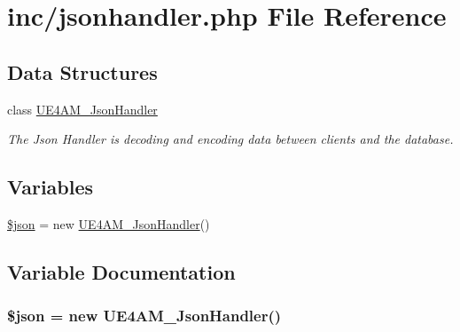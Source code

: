 \hypertarget{jsonhandler_8php}{\section{inc/jsonhandler.php File Reference}
\label{jsonhandler_8php}
}
\subsection*{Data Structures}
\begin{DoxyCompactItemize}
\item 
class \hyperlink{class_u_e4_a_m___json_handler}{U\-E4\-A\-M\-\_\-\-Json\-Handler}
\begin{DoxyCompactList}\small\item\em The Json Handler is decoding and encoding data between clients and the database. \end{DoxyCompactList}\end{DoxyCompactItemize}
\subsection*{Variables}
\begin{DoxyCompactItemize}
\item 
\hyperlink{jsonhandler_8php_acedd13b51401130848ce18f4d5c52605}{\$json} = new \hyperlink{class_u_e4_a_m___json_handler}{U\-E4\-A\-M\-\_\-\-Json\-Handler}()
\end{DoxyCompactItemize}


\subsection{Variable Documentation}
\hypertarget{jsonhandler_8php_acedd13b51401130848ce18f4d5c52605}{
\subsubsection[{\$json}]{\setlength{\rightskip}{0pt plus 5cm}\$json = new {\bf U\-E4\-A\-M\-\_\-\-Json\-Handler}()}}\label{jsonhandler_8php_acedd13b51401130848ce18f4d5c52605}
